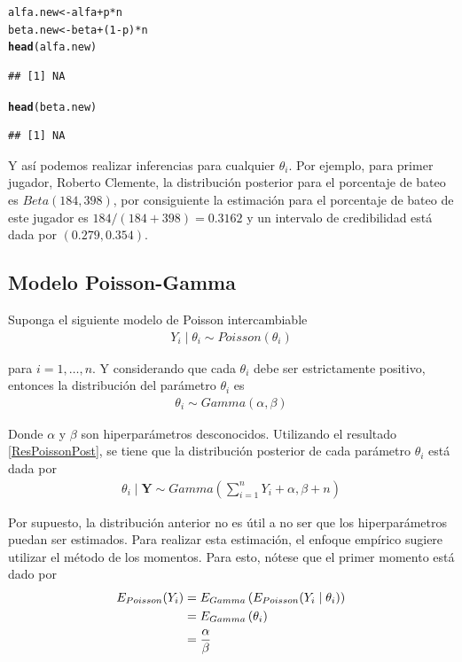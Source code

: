 \documentclass[10pt,openright]{book}\usepackage[]{graphicx}\usepackage[]{color}
\makeatletter
\newcommand{\hlnum}[1]{\textcolor[rgb]{0.686,0.059,0.569}{#1}}%
\newcommand{\hlopt}[1]{\textcolor[rgb]{0,0,0}{#1}}%
\newcommand{\hlstd}[1]{\textcolor[rgb]{0.345,0.345,0.345}{#1}}%
\newcommand{\hlkwb}[1]{\textcolor[rgb]{0.69,0.353,0.396}{#1}}%
\newcommand{\hlkwd}[1]{\textcolor[rgb]{0.737,0.353,0.396}{\textbf{#1}}}%
\newenvironment{kframe}{%
 \def\at@end@of@kframe{}%
 \ifinner\ifhmode%
  \def\at@end@of@kframe{\end{minipage}}%
  \begin{minipage}{\columnwidth}%
 \fi\fi%
 \def\FrameCommand##1{\hskip\@totalleftmargin \hskip-\fboxsep
 \colorbox{shadecolor}{##1}\hskip-\fboxsep
     \hskip-\linewidth \hskip-\@totalleftmargin \hskip\columnwidth}%
 \MakeFramed {\advance\hsize-\width
   \@totalleftmargin\z@ \linewidth\hsize
   \@setminipage}}%
 {\par\unskip\endMakeFramed%
 \at@end@of@kframe}
\newenvironment{knitrout}{}{} %
\makeatother
\begin{document}
\begin{Eje}
\begin{knitrout}
\begin{kframe}
\begin{alltt}
\hlstd{alfa.new} \hlkwb{<-} \hlstd{alfa} \hlopt{+} \hlstd{p}\hlopt{*}\hlstd{n}
\hlstd{beta.new} \hlkwb{<-} \hlstd{beta} \hlopt{+} \hlstd{(}\hlnum{1}\hlopt{-}\hlstd{p)}\hlopt{*}\hlstd{n}
\hlkwd{head}\hlstd{(alfa.new)}
\end{alltt}
\begin{verbatim}
## [1] NA
\end{verbatim}
\begin{alltt}
\hlkwd{head}\hlstd{(beta.new)}
\end{alltt}
\begin{verbatim}
## [1] NA
\end{verbatim}
\end{kframe}
\end{knitrout}
Y as\'i podemos realizar inferencias para cualquier $\theta_i$. Por ejemplo, para primer jugador, Roberto Clemente, la distribuci\'on posterior para el porcentaje de bateo es $Beta(184, 398)$, por consiguiente la estimaci\'on para el porcentaje de bateo de este jugador es $184/(184+398)=0.3162$ y un intervalo de credibilidad est\'a dada por $(0.279,0.354)$. 
\end{Eje}

\subsection{Modelo Poisson-Gamma}

Suponga el siguiente modelo de Poisson intercambiable
\begin{align*}
Y_i  \mid  \theta_i \sim Poisson(\theta_i)
\end{align*}

para $i=1,\ldots,n$. Y considerando que cada $\theta_i$ debe ser estrictamente positivo, entonces la distribuci\'on del par\'ametro $\theta_i$ es
\begin{align*}
\theta_i \sim Gamma(\alpha,\beta)
\end{align*}

Donde $\alpha$ y $\beta$ son hiperpar\'ametros desconocidos. Utilizando el resultado \ref{ResPoissonPost}, se tiene que la distribuci\'on posterior de cada par\'ametro $\theta_i$ est\'a dada por
\begin{align*}
\theta_i \mid \mathbf{Y} \sim Gamma\left(\sum_{i=1}^n Y_i+\alpha,\beta+n\right)
\end{align*}

Por supuesto, la distribuci\'on anterior no es \'util a no ser que los hiperpar\'ametros puedan ser estimados. Para realizar esta estimaci\'on, el enfoque emp\'irico sugiere utilizar el m\'etodo de los momentos. Para esto, n\'otese que el primer momento est\'a dado por
\begin{align}\label{ESP_Poisson_Gamma}
E_{Poisson}(Y_i)&=E_{Gamma}\left(E_{Poisson}(Y_i \mid \theta_i)\right)\notag \\
&=E_{Gamma}\left(\theta_i\right) \notag \\
&=\frac{\alpha}{\beta}
\end{align}
\end{document}
